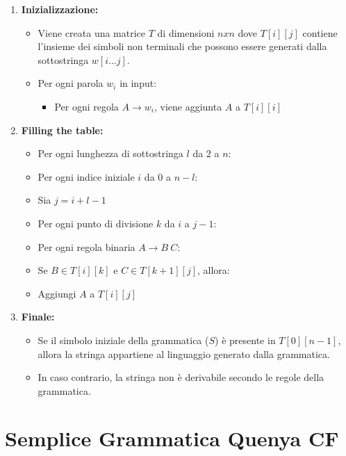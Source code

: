 \begin{enumerate}
  \item \textbf{Inizializzazione:} 
    \begin{itemize}
      \item Viene creata una matrice $T$ di dimensioni $n x n$ dove $T[i][j]$ contiene l'insieme dei simboli non terminali che possono essere generati dalla sottostringa $w[i\dots j]$. 
      \item Per ogni parola $w_i$ in input: 
      \begin{itemize}
        \item Per ogni regola $A \rightarrow w_i$, viene aggiunta $A$ a $T[i][i]$
      \end{itemize}
    \end{itemize}
  

\item \textbf{Filling the table:}
  \begin{itemize}
    \item Per ogni lunghezza di sottostringa $l$ da $2$ a $n$:
    \item[] Per ogni indice iniziale $i$ da $0$ a $n - l$:
    \item[] \quad Sia $j = i + l - 1$
    \item[] \quad Per ogni punto di divisione $k$ da $i$ a $j - 1$:
    \item[] \quad \quad Per ogni regola binaria $A \rightarrow B \ C$:
    \item[] \quad \quad \quad Se $B \in T[i][k]$ e $C \in T[k+1][j]$, allora:
    \item[] \quad \quad \quad \quad Aggiungi $A$ a $T[i][j]$
  \end{itemize}

  \item \textbf{Finale:}
    \begin{itemize}
      \item Se il simbolo iniziale della grammatica ($S$) è presente in $T[0][n-1]$, allora la stringa appartiene al linguaggio generato dalla grammatica.
      \item In caso contrario, la stringa non è derivabile secondo le regole della grammatica.
    \end{itemize}
\end{enumerate}

\section{Semplice Grammatica Quenya CF}


